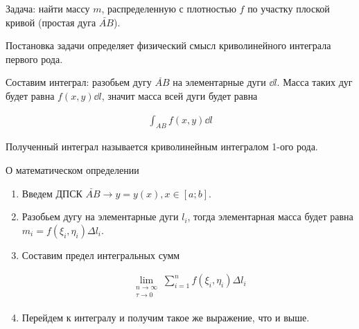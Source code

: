 
Задача: найти массу \(m\), распределенную с плотностью \(f\) по
участку плоской кривой (простая дуга \(\breve{AB}\)).

\begin{remark}
  Постановка задачи определяет физический смысл криволинейного интеграла первого
  рода.
\end{remark}

Составим интеграл: разобьем дугу \(\breve{AB}\) на элементарные
дуги \(\dd l\). Масса таких дуг будет равна \(f(x, y) \dd l\), значит масса всей
дуги будет равна

\begin{align*}
  \int_{AB} f(x, y) \dd l
\end{align*}

Полученный интеграл называется криволинейным интегралом 1-ого рода.

\begin{remark}
  О математическом определении

  \begin{enumerate}
    \item Введем ДПСК \(\breve{AB} \to y = y(x), x \in [a; b]\).
    \item Разобьем дугу на элементарные дуги \(l_{i}\),
      тогда элементарная масса будет равна
      \(m_{i} = f(\xi_{i}, \eta_{i}) \Delta l_{i}\).
  
    \item Составим предел интегральных сумм
    
    \begin{align*}
      \lim_{\substack{n \to \infty \\ \tau \to 0}}
        \sum_{i = 1}^{n} f(\xi_{i}, \eta_{i}) \Delta l_{i}
    \end{align*}
    
    \item Перейдем к интегралу и получим такое же выражение, что и выше.
  \end{enumerate}
\end{remark}

